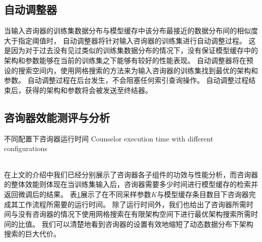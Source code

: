
\subsection{自动调整器}

当输入咨询器的训练集数据分布与模型缓存中该分布最接近的数据分布间的相似度大于指定阈值时，
自动调整器将针对输入咨询器的训练集进行自动调整过程。
这是因为对于过去没有见过类似的训练集数据分布的情况下，没有保证模型缓存中的{\rmi}架构和参数能够在当前的训练集之下能够有较好的性能表现。
自动调整器将在预设的搜索空间内，使用网格搜索的方法来为输入咨询器的训练集找到最优的{\rmi}架构和参数。
自动调整过程在后台发生，不会阻塞任何索引查询操作。
自动调整过程结束后，获得的{\rmi}架构和参数将会被发送至终结器。


\subsection{咨询器效能测评与分析}

\begin{table}[!hpb]
  \centering
  \bicaption[不同配置下咨询器运行时间]
    {不同配置下咨询器运行时间}
    {Counselor execution time with different configurations}
  \label{tab:counselor}
  \begin{tabular}{@{}llr@{}} \toprule
  \end{tabular}
\end{table}

在上文的介绍中我们已经分别展示了咨询器各子组件的功效与性能分析，而咨询器的整体效能则体现在当训练集输入后，咨询器需要多少时间进行模型缓存的检索并返回微调后的结果。
表\ref{tab:counselor}展示了在不同采样参数$K$与模型缓存条目数目下咨询器完成其工作流程所需要的运行时间。
除了运行时间外，我们也给出了咨询器所需时间与没有咨询器的情况下使用网格搜索在有限架构空间下进行最优架构搜索所需时间的比值。
我们可以清楚地看到咨询器的设置有效地缩短了动态数据分布下架构搜索的巨大代价。

